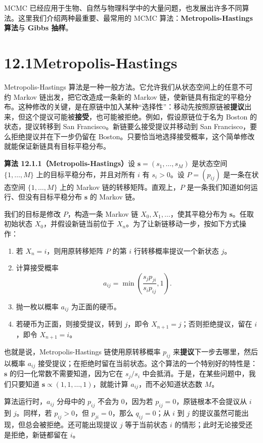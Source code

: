\documentclass[UTF8,12pt,a4paper,fontset=fandol]{ctexart}
\begin{document}
MCMC 已经应用于生物、自然与物理科学中的大量问题，也发展出许多不同算法。这里我们介绍两种最重要、最常用的 MCMC 算法：\textbf{Metropolis-Hastings 算法}与 \textbf{Gibbs 抽样}。

\section*{12.1\quad Metropolis-Hastings}

Metropolis-Hastings 算法是一种一般方法。它允许我们从状态空间上的任意不可约 Markov 链出发，把它改造成一条新的 Markov 链，使新链具有指定的平稳分布。这种修改的关键，是在原链中加入某种“选择性”：移动先按照原链被\textbf{提议}出来，但这个提议可能被\textbf{接受}，也可能被拒绝。例如，假设原链位于名为 Boston 的状态，提议转移到 San Francisco。新链要么接受提议并移动到 San Francisco，要么拒绝提议并在下一步仍留在 Boston。只要恰当地选择接受概率，这个简单修改就能保证新链具有目标平稳分布。

\noindent\textbf{算法 12.1.1（Metropolis-Hastings）}\quad 设 $\mathbf s=(s_1,\ldots,s_M)$ 是状态空间 $\{1,\ldots,M\}$ 上的目标平稳分布，并且对所有 $i$ 有 $s_i>0$。设 $P=(p_{ij})$ 是一条在状态空间 $\{1,\ldots,M\}$ 上的 Markov 链的转移矩阵。直观上，$P$ 是一条我们知道如何运行、但没有目标平稳分布 $\mathbf s$ 的 Markov 链。

我们的目标是修改 $P$，构造一条 Markov 链 $X_0,X_1,\ldots$，使其平稳分布为 $\mathbf s$。任取初始状态 $X_0$，并假设新链当前位于 $X_n$。为了让新链移动一步，按如下方式操作：
\begin{enumerate}
  \item 若 $X_n=i$，则用原转移矩阵 $P$ 的第 $i$ 行转移概率提议一个新状态 $j$。
  \item 计算接受概率
  \[
    a_{ij}=\min\left(\frac{s_jp_{ji}}{s_ip_{ij}},1\right).
  \]
  \item 抛一枚以概率 $a_{ij}$ 为正面的硬币。
  \item 若硬币为正面，则接受提议，转到 $j$，即令 $X_{n+1}=j$；否则拒绝提议，留在 $i$，即令 $X_{n+1}=i$。
\end{enumerate}

也就是说，Metropolis-Hastings 链使用原转移概率 $p_{ij}$ 来\textbf{提议}下一步去哪里，然后以概率 $a_{ij}$ 接受提议；在拒绝时留在当前状态。这个算法的一个特别好的特性是：$\mathbf s$ 的归一化常数不需要知道，因为它在 $s_j/s_i$ 中会抵消。于是，在某些问题中，我们只要知道 $\mathbf s\propto(1,1,\ldots,1)$，就能计算 $a_{ij}$，而不必知道状态数 $M$。

算法运行时，$a_{ij}$ 分母中的 $p_{ij}$ 不会为 $0$，因为若 $p_{ij}=0$，原链根本不会提议从 $i$ 到 $j$。同样，若 $p_{ij}>0$，但 $p_{ji}=0$，那么 $q_{ij}=0$；从 $i$ 到 $j$ 的提议虽然可能出现，但总会被拒绝。还可能出现提议 $j$ 等于当前状态 $i$ 的情形；此时无论接受还是拒绝，新链都留在 $i$。
\end{document}
